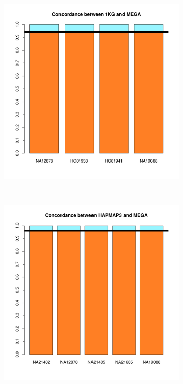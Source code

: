 \documentclass[11pt]{report}
\begin{document}
\begin{figure}[ht!]
    \centering
    \caption{Comparacion sin cluster}
    \begin{subfigure}[t]{0.5\textwidth}
        \centering
        \includegraphics[scale=0.55]{Concordance_1KG_MEGA_nocluster.pdf}
    \end{subfigure}%
    ~ 
    \begin{subfigure}[t]{0.5\textwidth}
        \centering
        \includegraphics[scale=0.55]{Concordance_HAPMAP_MEGA_nocluster.pdf}
	 \end{subfigure}
\end{figure}
\end{document}
